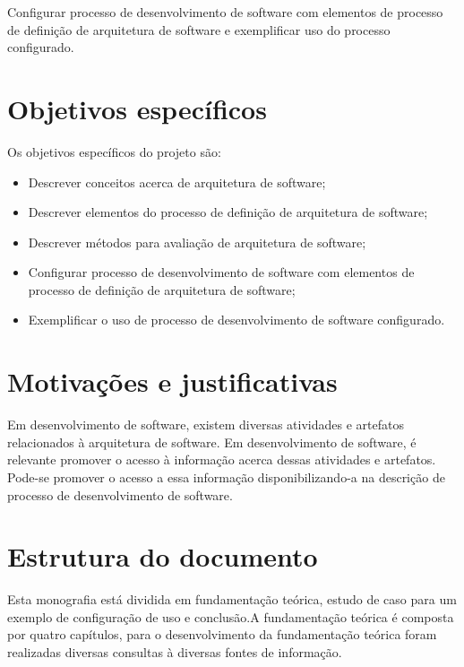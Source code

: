 Configurar processo de desenvolvimento de software com elementos de processo de definição de arquitetura de software e exemplificar uso do processo configurado.

\section{Objetivos específicos}

Os objetivos específicos do projeto são:
\begin{itemize}
    \item Descrever  conceitos acerca de arquitetura de software;
    \item Descrever elementos do processo de definição de arquitetura de software;
    \item Descrever métodos para avaliação de arquitetura de software;
    \item Configurar processo de desenvolvimento de software com elementos de processo de definição de arquitetura de software;
    \item Exemplificar o uso de processo de desenvolvimento de software configurado.
\end{itemize}

\section{Motivações e justificativas}

Em desenvolvimento de software, existem diversas atividades e artefatos relacionados à arquitetura de software. Em desenvolvimento de software, é relevante promover o acesso à informação acerca dessas atividades e artefatos. Pode-se promover o acesso a essa informação disponibilizando-a na descrição de processo de desenvolvimento de software.

\section{Estrutura do documento}

Esta monografia está dividida em fundamentação teórica, estudo de caso para um exemplo de configuração de uso e conclusão.A fundamentação teórica é composta por quatro capítulos, para o desenvolvimento da fundamentação teórica foram realizadas diversas consultas à diversas fontes de informação.

